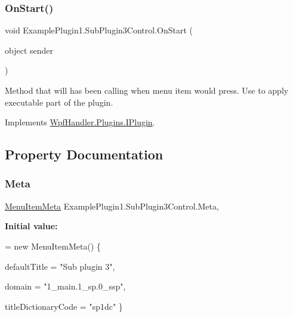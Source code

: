 \subsubsection{\texorpdfstring{On\+Start()}{OnStart()}}
{\footnotesize\ttfamily void Example\+Plugin1.\+Sub\+Plugin3\+Control.\+On\+Start (\begin{DoxyParamCaption}\item[{object}]{sender }\end{DoxyParamCaption})}



Method that will has been calling when menu item would press. Use to apply executable part of the plugin. 



Implements \mbox{\hyperlink{interface_wpf_handler_1_1_plugins_1_1_i_plugin_aabe1a8e5680ebeb37f96ffe86b6123e9}{Wpf\+Handler.\+Plugins.\+I\+Plugin}}.



\subsection{Property Documentation}
\mbox{\label{class_example_plugin1_1_1_sub_plugin3_control_a639fe64f80285d5100d1411d4fc92094}} 
\subsubsection{\texorpdfstring{Meta}{Meta}}
{\footnotesize\ttfamily \mbox{\hyperlink{class_wpf_handler_1_1_plugins_1_1_menu_item_meta}{Menu\+Item\+Meta}} Example\+Plugin1.\+Sub\+Plugin3\+Control.\+Meta\hspace{0.3cm}{\ttfamily [get]}, {\ttfamily [set]}}

{\bfseries Initial value\+:}
\begin{DoxyCode}
= \textcolor{keyword}{new} MenuItemMeta()
        \{
            
            defaultTitle = \textcolor{stringliteral}{"Sub plugin 3"},

            
            domain = \textcolor{stringliteral}{"1\_main.1\_sp.0\_ssp"},

            
            titleDictionaryCode = \textcolor{stringliteral}{"sp1dc"}
        \}
\end{DoxyCode}


